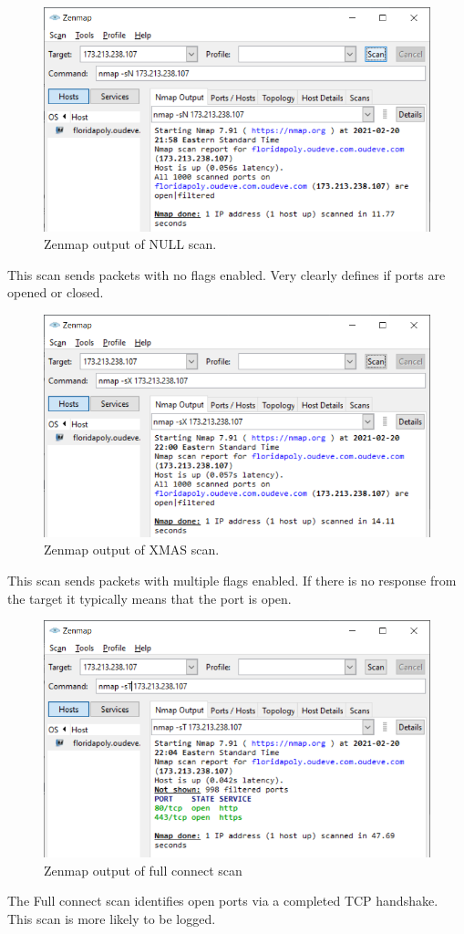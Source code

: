 \begin{figure}[H]
    \centering
    \includegraphics[width=\linewidth]{figures/b2.png}
    \caption{Zenmap output of NULL scan.}
\end{figure}
This scan sends packets with no flags enabled.
Very clearly defines if ports are opened or closed.

\begin{figure}[H]
    \centering
    \includegraphics[width=\linewidth]{figures/b3.png}
    \caption{Zenmap output of XMAS scan.}
\end{figure}
This scan sends packets with multiple flags enabled.
If there is no response from the target it typically means that the port is open.

\begin{figure}[H]
    \centering
    \includegraphics[width=\linewidth]{figures/b4.png}
    \caption{Zenmap output of full connect scan}
\end{figure}
The Full connect scan identifies open ports via a completed TCP handshake.
This scan is more likely to be logged.

